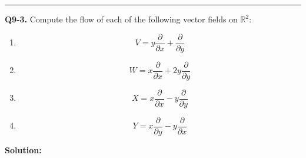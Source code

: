 \documentclass{article}
\newcommand{\R}{\mathbb{R}}
\begin{document}
\vskip 0.5cm
\hrule 
\vskip 0.5cm


\textbf{Q9-3.} Compute the flow of each of the following vector fields on $\R^2$:
\begin{enumerate}[label=(\alph*)]
  \item \[ V = y \frac{\partial}{\partial x} + \frac{\partial}{\partial y} \]
  \item \[ W = x \frac{\partial}{\partial x} + 2y \frac{\partial}{\partial y}   \]
  \item \[ X = x \frac{\partial}{\partial x} - y \frac{\partial}{\partial y}  \]
  \item \[ Y = x \frac{\partial}{\partial y} - y \frac{\partial}{\partial x}  \]
\end{enumerate} 

\vskip 0.5cm
\textbf{Solution:}
\end{document}
